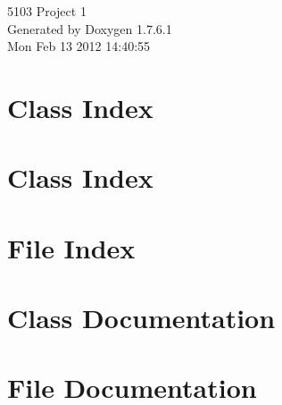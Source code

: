 \documentclass[a4paper]{book}
\begin{document}
\hypersetup{pageanchor=false,citecolor=blue}
\begin{titlepage}
\vspace*{7cm}
\begin{center}
{\Large 5103 \-Project 1 }\\
\vspace*{1cm}
{\large \-Generated by Doxygen 1.7.6.1}\\
\vspace*{0.5cm}
{\small Mon Feb 13 2012 14:40:55}\\
\end{center}
\end{titlepage}
\clearemptydoublepage
{}
\tableofcontents
\clearemptydoublepage
{}
\hypersetup{pageanchor=true,citecolor=blue}
\chapter{\-Class \-Index}

\chapter{\-Class \-Index}

\chapter{\-File \-Index}

\chapter{\-Class \-Documentation}













\chapter{\-File \-Documentation}






\printindex
\end{document}
